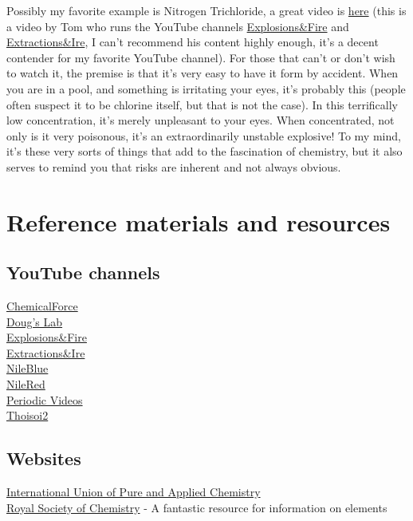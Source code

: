 \documentclass{book}
\begin{document}
Possibly my favorite example is Nitrogen Trichloride, a great video is \href{https://www.youtube.com/watch?v=mV_daaldE_I}{here} (this is a video by Tom who runs the YouTube channels \href{https://www.youtube.com/c/ExplosionsFire2}{Explosions\&Fire} and \href{https://www.youtube.com/c/ExtractionsIre}{Extractions\&Ire}, I can't recommend his content highly enough, it's a decent contender for my favorite YouTube channel).  For those that can't or don't wish to watch it, the premise is that it's very easy to have it form by accident.  When you are in a pool, and something is irritating your eyes, it's probably this (people often suspect it to be chlorine itself, but that is not the case).  In this terrifically low concentration, it's merely unpleasant to your eyes.  When concentrated, not only is it very poisonous, it's an extraordinarily unstable explosive!  To my mind, it's these very sorts of things that add to the fascination of chemistry, but it also serves to remind you that risks are inherent and not always obvious.\\

\section{Reference materials and resources}

\subsection{YouTube channels}
\href{https://www.youtube.com/c/ChemicalForce}{ChemicalForce}\\
\href{https://www.youtube.com/user/DougsLab}{Doug's Lab}\\
\href{https://www.youtube.com/c/ExplosionsFire2}{Explosions\&Fire}\\
\href{https://www.youtube.com/c/ExtractionsIre}{Extractions\&Ire}\\
\href{https://www.youtube.com/c/NileRed2}{NileBlue}\\
\href{https://www.youtube.com/c/NileRed}{NileRed}\\
\href{https://www.youtube.com/user/periodicvideose}{Periodic Videos}\\
\href{https://www.youtube.com/c/Thoisoi2}{Thoisoi2}\\

\subsection{Websites}
\href{https://iupac.org/}{International Union of Pure and Applied Chemistry}\\
\href{https://www.rsc.org/}{Royal Society of Chemistry} - A fantastic resource for information on elements\\
\end{document}
